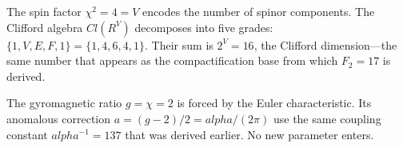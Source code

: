 \documentclass[11pt,a4paper]{book}
\def\alpha{alpha}%
\def\mathrm#1{#1}%
\def\mathbb#1{#1}%
\begin{document}
The spin factor $\chi^2 = 4 = V$ encodes the number of spinor components.
The Clifford algebra $\mathrm{Cl}(\mathbb{R}^V)$ decomposes into five
grades: $\{1, V, E, F, 1\} = \{1, 4, 6, 4, 1\}$.  Their sum is
$2^V = 16$, the Clifford dimension---the same number that appears as the
compactification base from which $F_2 = 17$ is derived.

The gyromagnetic ratio $g = \chi = 2$ is forced by the Euler
characteristic.  Its anomalous correction $a = (g-2)/2 = \alpha/(2\pi)$
use the same coupling constant $\alpha^{-1} = 137$ that was derived
earlier.  No new parameter enters.

\begin{code}%
\>[0]\<%
\\
\>[0]\AgdaSpace{}%
\AgdaSymbol{:}\AgdaSpace{}%
\AgdaSpace{}%
\AgdaSpace{}%
\<%
\\
\>[0]\AgdaSpace{}%
\AgdaSymbol{=}\AgdaSpace{}%
\<%
\\
%
\\[\AgdaEmptyExtraSkip]%
\>[0]\AgdaSpace{}%
\AgdaSymbol{:}\AgdaSpace{}%
\AgdaSpace{}%
\AgdaSpace{}%
\<%
\\
\>[0]\AgdaSpace{}%
\AgdaSymbol{=}\AgdaSpace{}%
\<%
\\
%
\\[\AgdaEmptyExtraSkip]%
\>[0]\<%
\\
\>[0]\AgdaSpace{}%
\AgdaSymbol{:}\AgdaSpace{}%
\<%
\\
\>[0]\AgdaSpace{}%
\AgdaSymbol{=}\AgdaSpace{}%
\<%
\\
%
\\[\AgdaEmptyExtraSkip]%
\>[0]\AgdaSpace{}%
\AgdaSymbol{:}\AgdaSpace{}%
\<%
\\
\>[0]\AgdaSpace{}%
\AgdaSymbol{=}\AgdaSpace{}%
%
\>[25]\<%
\\
%
\\[\AgdaEmptyExtraSkip]%
\>[0]\AgdaSpace{}%

\end{code}
\end{document}

